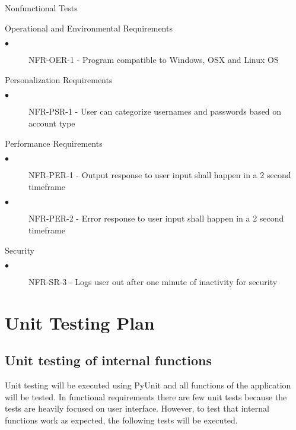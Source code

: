 \documentclass[12pt, titlepage]{article}
\begin{document}
Nonfunctional Tests
\begin{description}
    \item Operational and Environmental Requirements
    \begin{description}
          \item[$\bullet$] NFR-OER-1 - Program compatible to Windows, OSX and Linux OS
    \end{description}
    \item Personalization Requirements
    \begin{description}
          \item[$\bullet$] NFR-PSR-1 - User can categorize usernames and passwords based on account type
    \end{description}
    \item{Performance Requirements}
    \begin{description}
          \item[$\bullet$] NFR-PER-1 - Output response to user input shall happen in a 2 second timeframe
          \item[$\bullet$] NFR-PER-2 - Error response to user input shall happen in a 2 second timeframe
    \end{description}
    \item{Security}
    \begin{description}
          \item[$\bullet$] NFR-SR-3 - Logs user out after one minute of inactivity for security
    \end{description}
\end{description}

\section{Unit Testing Plan}
		
\subsection{Unit testing of internal functions}
		
Unit testing will be executed using PyUnit and all functions of the application will be tested. In functional requirements there are few unit tests because the tests are heavily focused on user interface. However, to test that internal functions work as expected, the following tests will be executed.
\end{document}
